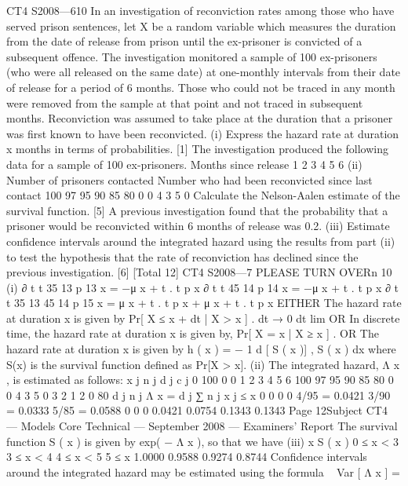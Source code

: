 \documentclass[a4paper,12pt]{article}
\begin{document}
\begin{enumerate}
CT4 S2008—610
In an investigation of reconviction rates among those who have served prison
sentences, let X be a random variable which measures the duration from the date of
release from prison until the ex-prisoner is convicted of a subsequent offence. The
investigation monitored a sample of 100 ex-prisoners (who were all released on the
same date) at one-monthly intervals from their date of release for a period of 6
months. Those who could not be traced in any month were removed from the sample
at that point and not traced in subsequent months. Reconviction was assumed to take
place at the duration that a prisoner was first known to have been reconvicted.
(i)
Express the hazard rate at duration x months in terms of probabilities.
[1]
The investigation produced the following data for a sample of 100 ex-prisoners.
Months since release
1
2
3
4
5
6
(ii)
Number of prisoners
contacted
Number who had
been reconvicted
since last contact
100
97
95
90
85
80
0
0
4
3
5
0
Calculate the Nelson-Aalen estimate of the survival function.
[5]
A previous investigation found that the probability that a prisoner would be
reconvicted within 6 months of release was 0.2.
(iii)
Estimate confidence intervals around the integrated hazard using the results
from part (ii) to test the hypothesis that the rate of reconviction has declined
since the previous investigation.
[6]
[Total 12]
CT4 S2008—7
PLEASE TURN OVERn
10
(i)
∂ t t 35
13
p 13
x = −μ x + t . t p x
∂ t t 45
14
p 14
x = −μ x + t . t p x
∂ t t 35
13
45
14
p 15
x = μ x + t . t p x + μ x + t . t p x
EITHER
The hazard rate at duration x is given by
Pr[ X ≤ x + dt | X > x ]
.
dt → 0
dt
lim
OR
In discrete time, the hazard rate at duration x is given by, Pr[ X = x | X ≥ x ] .
OR
The hazard rate at duration x is given by h ( x ) = −
1 d
[ S ( x )] ,
S ( x ) dx
where S(x) is the survival function defined as Pr[X > x].
(ii)
The integrated hazard, Λ x , is estimated as follows:
x j
n j
d j
c j
0 100 0 0
1
2
3
4
5
6 100
97
95
90
85
80 0
0
4
3
5
0 3
2
1
2
0
80
d j
n j
Λ x =
d j
∑ n j
x j ≤ x
0 0
0
0
4/95 = 0.0421
3/90 = 0.0333
5/85 = 0.0588
0 0
0
0.0421
0.0754
0.1343
0.1343
Page 12Subject CT4 — Models Core Technical — September 2008 — Examiners’ Report
The survival function S ( x ) is given by exp( − Λ x ), so that we have
(iii)
x S ( x )
0 ≤ x < 3
3 ≤ x < 4
4 ≤ x < 5
5 ≤ x 1.0000
0.9588
0.9274
0.8744
Confidence intervals around the integrated hazard may
be estimated using the formula
~
Var [ Λ x ] =

\end{enumerate}
\end{document}

